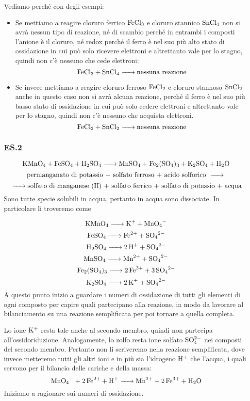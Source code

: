 Vediamo perché con degli esempi:

\begin{itemize}[leftmargin=0.5cm]
  \item Se mettiamo a reagire cloruro ferrico $\rm FeCl_3$ e cloruro stannico $\rm SnCl_4$ non si avrà nessun tipo di reazione, né di scambio perché in entrambi i composti l'anione è il cloruro, né redox perché il ferro è nel suo più alto stato di ossidazione in cui può solo ricevere elettroni e altrettanto vale per lo stagno, quindi non c'è nessuno che cede elettroni:
  $$\ce{FeCl_3 + SnCl_4 ->}\text{nessuna reazione}$$
  \item Se invece mettiamo a reagire cloruro ferroso $\rm FeCl_2$ e cloruro stannoso $\rm SnCl_2$ anche in questo caso non si avrà alcuna reazione, perché il ferro è nel suo più basso stato di ossidazione in cui può solo cedere elettroni e altrettanto vale per lo stagno, quindi non c'è nessuno che acquista elettroni.
$$\ce{FeCl_2 + SnCl_2 ->}\text{nessuna reazione}$$
\end{itemize}
\subsubsection{\textbf{ES.2}}
$$\ce{KMnO_4 + FeSO_4 + H_2SO_4 -> MnSO_4 + Fe_2(SO_4)_3 + K_2SO_4 + H_2O}$$
$$\text{permanganato di potassio + solfato ferroso + acido solforico \ce{->}}$$
$$\ce{->}\text{solfato di manganese (II) + solfato ferrico + solfato di potassio + acqua}$$
Sono tutte specie solubili in acqua, pertanto in acqua sono dissociate. In particolare li troveremo come

$$\ce{KMnO_4 -> K^+ + MnO_4^-}$$
$$\ce{FeSO_4 -> Fe^{2+} + SO_4^{2-}}$$
$$\ce{H_2SO_4 -> 2 H^+ + SO_4^{2-}}$$
$$\ce{MnSO_4 -> Mn^{2+} + SO_4^{2-}}$$
$$\ce{Fe_2(SO_4)_3 -> 2 Fe^{3+} + 3 SO_4^{2-}}$$
$$\ce{K_2SO_4 -> 2 K^+ + SO_4^{2-}}$$
A questo punto inizio a guardare i numeri di ossidazione di tutti gli elementi di ogni composto per capire quali partecipano alla reazione, in modo da lavorare al bilanciamento su una reazione semplificata per poi tornare a quella completa.

Lo ione $\rm K^+$ resta tale anche al secondo membro, quindi non partecipa all'ossidoriduzione. Analogamente, lo zolfo resta ione solfato $\rm SO_4^{2-}$ nei composti del secondo membro. Pertanto non li scriveremo nella reazione semplificata, dove invece metteremo tutti gli altri ioni e in più sia l'idrogeno $\rm H^+$ che l'acqua, i quali servono per il bilancio delle cariche e della massa:
$$\ce{MnO_4- + 2Fe^2+ + H+ -> Mn^2+ + 2Fe^3+ + H_2O}$$
Iniziamo a ragionare sui numeri di ossidazione.

